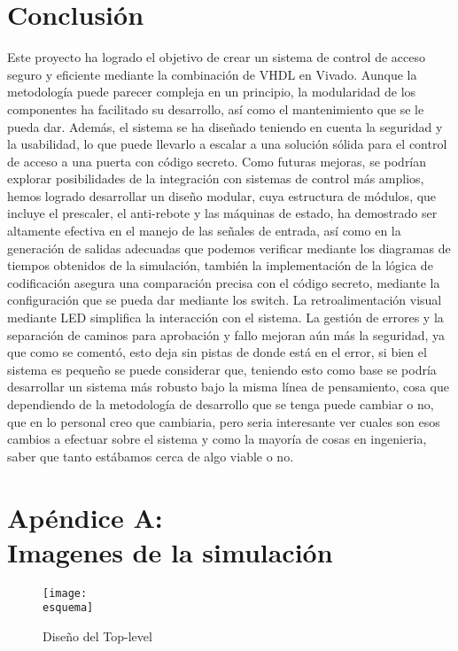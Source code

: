 \documentclass[a4paper, 12pt]{article}
\newcommand{\esquema}{img/esq.jpg}
\begin{document}
    \section{Conclusión}
    Este proyecto ha logrado el objetivo de crear un sistema de control de acceso seguro y eficiente mediante la combinación de VHDL en Vivado. Aunque la metodología puede parecer compleja en un principio, la modularidad de los componentes ha facilitado su desarrollo, así como el mantenimiento que se le pueda dar. Además, el sistema se ha diseñado teniendo en cuenta la seguridad y la usabilidad, lo que puede llevarlo a escalar a una solución sólida para el control de acceso a una puerta con código secreto. Como futuras mejoras, se podrían explorar posibilidades de la integración con sistemas de control más amplios, hemos logrado desarrollar un diseño modular, cuya estructura de módulos, que incluye el prescaler, el anti-rebote y las máquinas de estado, ha demostrado ser altamente efectiva en el manejo de las señales de entrada, así como en la generación de salidas adecuadas que podemos verificar mediante los diagramas de tiempos obtenidos de la simulación, también la implementación de la lógica de codificación asegura una comparación precisa con el código secreto, mediante la configuración que se pueda dar mediante los switch. La retroalimentación visual mediante LED simplifica la interacción con el sistema. La gestión de errores y la separación de caminos para aprobación y fallo mejoran aún más la seguridad, ya que como se comentó, esto deja sin pistas de donde está en el error, si bien el sistema es pequeño se puede considerar que, teniendo esto como base se podría desarrollar un sistema más robusto bajo la misma línea de pensamiento, cosa que dependiendo de la metodología de desarrollo que se tenga puede cambiar o no, que en lo personal creo que cambiaria, pero seria interesante ver cuales son esos cambios a efectuar sobre el sistema y como la mayoría de cosas en ingenieria, saber que tanto estábamos cerca de algo viable o no.   

    \appendix
    \section*{Apéndice A:\\Imagenes de la simulación}
    \begin{figure}[H]
        \centering
        \texttt{[image: \\esquema]}
        \caption{Diseño del Top-level}
        \label{fig:top-level}
    \end{figure}
\end{document}
